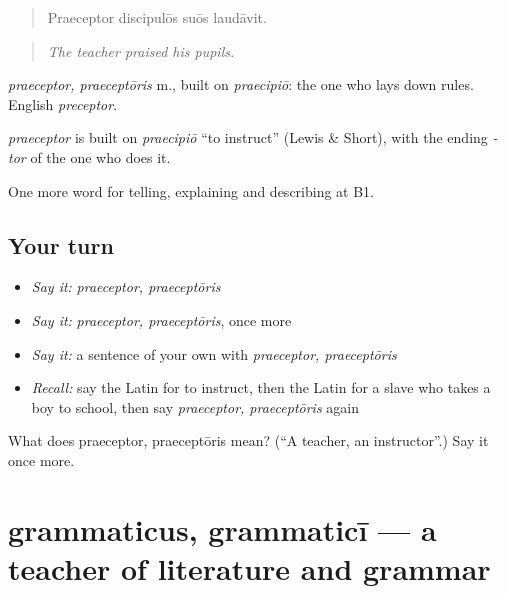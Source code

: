 \begin{quote}
Praeceptor discipulōs suōs laudāvit.
\end{quote}

\begin{quote}
\emph{The teacher praised his pupils.}
\end{quote}

\emph{praeceptor, praeceptōris} m., built on \emph{praecipiō}: the one who lays down rules. English \emph{preceptor}.

\begin{cousinweb}
\emph{praeceptor} is built on \emph{praecipiō} \textquotedblleft{}to instruct\textquotedblright{} (Lewis \& Short), with the ending \emph{-tor} of the one who does it.
\end{cousinweb}

\begin{grammarlens}[title={What you've built}]
One more word for telling, explaining and describing at B1.
\end{grammarlens}

\subsection*{Your turn}
\begin{itemize}
\raggedright
  \item \emph{Say it:} \emph{praeceptor, praeceptōris}
  \item \emph{Say it:} \emph{praeceptor, praeceptōris}, once more
  \item \emph{Say it:} a sentence of your own with \emph{praeceptor, praeceptōris}
  \item \emph{Recall:} say the Latin for to instruct, then the Latin for a slave who takes a boy to school, then say \emph{praeceptor, praeceptōris} again
\end{itemize}

\begin{tcolorbox}[breakable,colback=teal!4,colframe=teal!35!black,title={Before you move on}]
What does praeceptor, praeceptōris mean? (\textquotedblleft{}A teacher, an instructor\textquotedblright{}.) Say it once more.
\end{tcolorbox}
\section[grammaticus, grammaticī]{grammaticus, grammaticī — a teacher of literature and grammar}

\label{lesson:LA-C401-grammaticus}




